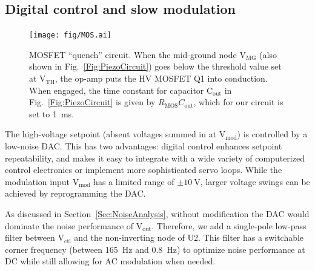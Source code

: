 \documentclass[aip,rsi,reprint]{revtex4-1} %
\begin{document}
%
%

\subsection{Digital control and slow modulation}
\label{Sec:SlowModulationMOS}

\begin{figure}[b!]
\texttt{[image: fig/MOS.ai]}
\caption{MOSFET ``quench'' circuit.
When the mid-ground node $\text{V}_\text{MG}$ (also shown in Fig.~\ref{Fig:PiezoCircuit}) goes below the threshold value set at $\text{V}_\text{TH}$, the op-amp puts the HV MOSFET Q1 into conduction.
When engaged, the time constant for capacitor $\text{C}_\text{out}$ in Fig.~\ref{Fig:PiezoCircuit} is given by $R_\text{MOS} C_\text{out}$, which for our circuit is set to \SI{1}{\milli\second}.
\label{Fig:MOS}}
\end{figure}

The high-voltage setpoint (absent voltages summed in at $\text{V}_\text{mod}$) is controlled by a low-noise DAC.
This has two advantages: digital control enhances setpoint repeatability, and makes it easy to integrate with a wide variety of computerized control electronics or implement more sophisticated servo loops.
While the modulation input $\text{V}_\text{mod}$ has a limited range of $\pm\SI{10}{\volt}$, larger voltage swings can be achieved by reprogramming the DAC.

As discussed in Section~\ref{Sec:NoiseAnalysis}, without modification the DAC would dominate the noise performance of $\text{V}_\text{out}$.
Therefore, we add a single-pole low-pass filter between $\text{V}_\text{ctl}$ and the non-inverting node of U2.
This filter has a switchable corner frequency (between \SI{165}{\hertz} and \SI{0.8}{\hertz}) to optimize noise performance at DC while still allowing for AC modulation when needed.
\end{document}
